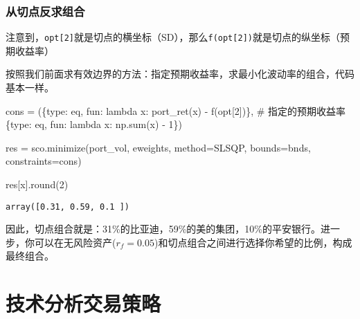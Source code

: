 \documentclass[
  letterpaper,
  DIV=11,
  numbers=noendperiod]{scrreprt}
\newenvironment{Shaded}{\begin{snugshade}}{\end{snugshade}}
\newcommand{\BuiltInTok}[1]{\textcolor[rgb]{0.00,0.23,0.31}{#1}}
\newcommand{\CommentTok}[1]{\textcolor[rgb]{0.37,0.37,0.37}{#1}}
\newcommand{\DecValTok}[1]{\textcolor[rgb]{0.68,0.00,0.00}{#1}}
\newcommand{\KeywordTok}[1]{\textcolor[rgb]{0.00,0.23,0.31}{#1}}
\newcommand{\NormalTok}[1]{\textcolor[rgb]{0.00,0.23,0.31}{#1}}
\newcommand{\OperatorTok}[1]{\textcolor[rgb]{0.37,0.37,0.37}{#1}}
\newcommand{\StringTok}[1]{\textcolor[rgb]{0.13,0.47,0.30}{#1}}
\begin{document}
\hypertarget{ux4eceux5207ux70b9ux53cdux6c42ux7ec4ux5408}{%
\subsection{从切点反求组合}\label{ux4eceux5207ux70b9ux53cdux6c42ux7ec4ux5408}}

注意到，\texttt{opt{[}2{]}}就是切点的横坐标（SD），那么\texttt{f(opt{[}2{]})}就是切点的纵坐标（预期收益率）

按照我们前面求有效边界的方法：指定预期收益率，求最小化波动率的组合，代码基本一样。

\begin{Shaded}
\begin{Highlighting}[]
\NormalTok{cons }\OperatorTok{=}\NormalTok{ (\{}\StringTok{\textquotesingle{}type\textquotesingle{}}\NormalTok{: }\StringTok{\textquotesingle{}eq\textquotesingle{}}\NormalTok{, }\StringTok{\textquotesingle{}fun\textquotesingle{}}\NormalTok{: }\KeywordTok{lambda}\NormalTok{ x: port\_ret(x) }\OperatorTok{{-}}\NormalTok{ f(opt[}\DecValTok{2}\NormalTok{])\}, }\CommentTok{\# 指定的预期收益率}
\NormalTok{        \{}\StringTok{\textquotesingle{}type\textquotesingle{}}\NormalTok{: }\StringTok{\textquotesingle{}eq\textquotesingle{}}\NormalTok{, }\StringTok{\textquotesingle{}fun\textquotesingle{}}\NormalTok{: }\KeywordTok{lambda}\NormalTok{ x: np.}\BuiltInTok{sum}\NormalTok{(x) }\OperatorTok{{-}} \DecValTok{1}\NormalTok{\})}

\NormalTok{res }\OperatorTok{=}\NormalTok{ sco.minimize(port\_vol, eweights, method}\OperatorTok{=}\StringTok{\textquotesingle{}SLSQP\textquotesingle{}}\NormalTok{,}
\NormalTok{                   bounds}\OperatorTok{=}\NormalTok{bnds, constraints}\OperatorTok{=}\NormalTok{cons)}

\NormalTok{res[}\StringTok{\textquotesingle{}x\textquotesingle{}}\NormalTok{].}\BuiltInTok{round}\NormalTok{(}\DecValTok{2}\NormalTok{)}
\end{Highlighting}
\end{Shaded}

\begin{verbatim}
array([0.31, 0.59, 0.1 ])
\end{verbatim}

因此，切点组合就是：31\%的比亚迪，59\%的美的集团，10\%的平安银行。进一步，你可以在无风险资产(\(r_f = 0.05\))和切点组合之间进行选择你希望的比例，构成最终组合。

\hypertarget{ux6280ux672fux5206ux6790ux4ea4ux6613ux7b56ux7565}{%
\chapter{技术分析交易策略}\label{ux6280ux672fux5206ux6790ux4ea4ux6613ux7b56ux7565}}
\end{document}
